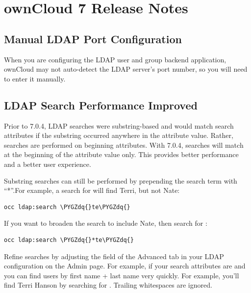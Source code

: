 \documentclass[letterpaper,10pt,english]{sphinxmanual}
\def\PYGZdq{\char`\"}
\begin{document}
\section{ownCloud 7 Release Notes}
\label{release_notes:owncloud-7-release-notes}

\subsection{Manual LDAP Port Configuration}
\label{release_notes:id1}
When you are configuring the LDAP user and group backend application, ownCloud
may not auto-detect the LDAP server's port number, so you will need to enter it
manually.


\subsection{LDAP Search Performance Improved}
\label{release_notes:ldap-search-performance-improved}
Prior to 7.0.4, LDAP searches were substring-based and would match search
attributes if the substring occurred anywhere in the attribute value. Rather,
searches are performed on beginning attributes. With 7.0.4, searches will match
at the beginning of the attribute value only. This provides better performance
and a better user experience.

Substring searches can still be performed by prepending the search term with
``*''.For example, a search for  will find Terri, but not Nate:

\begin{Verbatim}[commandchars=\\\{\}]
occ ldap:search \PYGZdq{}te\PYGZdq{}
\end{Verbatim}

If you want to broaden the search to include
Nate, then search for :

\begin{Verbatim}[commandchars=\\\{\}]
occ ldap:search \PYGZdq{}*te\PYGZdq{}
\end{Verbatim}

Refine searches by adjusting the  field of the
Advanced tab in your LDAP configuration on the Admin page. For example, if your
search attributes are  and  you can find users by first name
+ last name very quickly. For example, you'll find Terri Hanson by searching for
. Trailing whitespaces are ignored.
\end{document}
